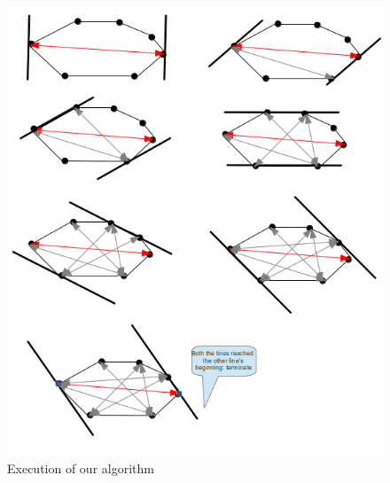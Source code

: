 \begin{figure}[ht]
  \centering
  \includegraphics[width=1\textwidth]{q2}
  \caption{Execution of our algorithm}
  \label{fig:q2}
\end{figure}
\clearpage